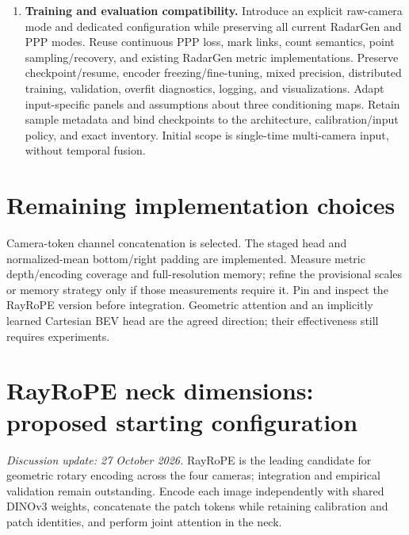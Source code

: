 \documentclass[11pt,a4paper]{article}
\begin{document}
\begin{enumerate}
Adapt this approach to the existing $512\times512$ Cartesian PPP output domain with intensity, RCS, and Doppler fields and the current continuous-loss semantics. No polar representation, explicit BEV queries, or explicit depth-based feature splatting is required by this design. RayRoPE's internal depth estimation serves attention and is separate from an explicit projection in the head. Restore the four jointly attended camera grids and concatenate along channels, $(B,4,D,H_p,W_p)\rightarrow(B,4D,H_p,W_p)$, followed by a learned channel projection. This user-selected arrangement avoids spatial tiling seams; The implemented initial head uses three isotropic 2x expansions and one vertical 2x expansion, with decreasing widths, then feature pooling to the Cartesian output grid. Do not treat arbitrary camera adjacency in that arrangement as physical BEV adjacency.

\item \textbf{Training and evaluation compatibility.}
Introduce an explicit raw-camera mode and dedicated configuration while preserving all current RadarGen and PPP modes. Reuse continuous PPP loss, mark links, count semantics, point sampling/recovery, and existing RadarGen metric implementations. Preserve checkpoint/resume, encoder freezing/fine-tuning, mixed precision, distributed training, validation, overfit diagnostics, logging, and visualizations. Adapt input-specific panels and assumptions about three conditioning maps. Retain sample metadata and bind checkpoints to the architecture, calibration/input policy, and exact inventory. Initial scope is single-time multi-camera input, without temporal fusion.
\end{enumerate}

\section{Remaining implementation choices}
Camera-token channel concatenation is selected. The staged head and normalized-mean bottom/right padding are implemented. Measure metric depth/encoding coverage and full-resolution memory; refine the provisional scales or memory strategy only if those measurements require it. Pin and inspect the RayRoPE version before integration. Geometric attention and an implicitly learned Cartesian BEV head are the agreed direction; their effectiveness still requires experiments.

\section{RayRoPE neck dimensions: proposed starting configuration}
\textit{Discussion update: 27 October 2026.}
RayRoPE is the leading candidate for geometric rotary encoding across the four cameras; integration and empirical validation remain outstanding. Encode each image independently with shared DINOv3 weights, concatenate the patch tokens while retaining calibration and patch identities, and perform joint attention in the neck.
\end{document}
